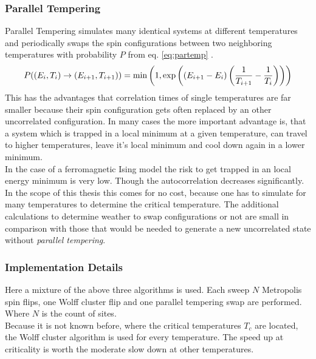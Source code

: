     \subsubsection{Parallel Tempering}
        Parallel Tempering\cite{ParallelTempering1986} simulates many identical systems at different
        temperatures and periodically swaps the spin configurations
        between two neighboring temperatures with probability \(P\) from
        eq. \eqref{eq:partemp} \cite[S. ??]{NewmanBarkema1999} \cite[S. 155ff]{Katzgraber2011}.
        \begin{equation}
            P((E_i,T_i) \to (E_{i+1},T_{i+1})) = \min\left(1,\exp\left(\left(E_{i+1}-E_i\right)\left(\frac{1}{T_{i+1}}-\frac{1}{T_i}\right)\right)\right)
            \label{eq:partemp}
        \end{equation}
        This has the advantages that correlation times of single
        temperatures are far smaller because their spin configuration
        gets often replaced by an other uncorrelated configuration. In
        many cases the more important advantage is, that a system which
        is trapped in a local minimum at a given temperature, can travel
        to higher temperatures, leave it's local minimum and cool down
        again in a lower minimum.\\
        In the case of a ferromagnetic Ising model the risk to get trapped
        in an local energy minimum is very low. Though the autocorrelation
        decreases significantly. In the scope of this thesis this comes
        for no cost, because one has to simulate for many temperatures
        to determine the critical temperature. The additional calculations
        to determine weather to swap configurations or not are small in
        comparison with those that would be needed to generate a new
        uncorrelated state without \emph{parallel tempering}.

    \subsubsection{Implementation Details}
        Here a mixture of the above three algorithms is used.
        Each sweep \(N\) Metropolis spin flips, one Wolff cluster flip
        and one parallel tempering swap are performed. Where \(N\) is the
        count of sites.\\
        Because it is not known before, where the critical temperatures
        \(T_c\) are located, the Wolff cluster algorithm is used for
        every temperature. The speed up at criticality is worth the
        moderate slow down at other temperatures.

